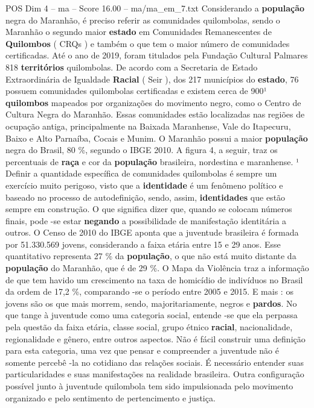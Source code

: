 \begin{textsample}{POS Dim 4 – ma – Score 16.00 – ma/ma\_em\_7.txt}
Considerando a \textbf{população} negra do Maranhão, é preciso referir as comunidades quilombolas, sendo o Maranhão o segundo maior \textbf{estado} em Comunidades Remanescentes de \textbf{Quilombos} ( CRQs ) e também o que tem o maior número de comunidades certificadas.
Até o ano de 2019, foram titulados pela Fundação Cultural Palmares 818 \textbf{territórios} quilombolas.
De acordo com a Secretaria de Estado Extraordinária de Igualdade \textbf{Racial} ( Seir ), dos 217 municípios do \textbf{estado}, 76 possuem comunidades quilombolas certificadas e existem cerca de 900¹ \textbf{quilombos} mapeados por organizações do movimento negro, como o Centro de Cultura Negra do Maranhão.
Essas comunidades estão localizadas nas regiões de ocupação antiga, principalmente na Baixada Maranhense, Vale do Itapecuru, Baixo e Alto Parnaíba, Cocais e Munim.
O Maranhão possui a maior \textbf{população} negra do Brasil, 80 \%, segundo o IBGE 2010.
A figura 4, a seguir, traz os percentuais de \textbf{raça} e cor da \textbf{população} brasileira, nordestina e maranhense. ¹ Definir a quantidade específica de comunidades quilombolas é sempre um exercício muito perigoso, visto que a \textbf{identidade} é um fenômeno político e baseado no processo de autodefinição, sendo, assim, \textbf{identidades} que estão sempre em construção.
O que significa dizer que, quando se colocam números finais, pode -se estar \textbf{negando} a possibilidade de manifestação identitária a outros.
O Censo de 2010 do IBGE aponta que a juventude brasileira é formada por 51.330.569 jovens, considerando a faixa etária entre 15 e 29 anos.
Esse quantitativo representa 27 \% da \textbf{população}, o que não está muito distante da \textbf{população} do Maranhão, que é de 29 \%.
O Mapa da Violência traz a informação de que tem havido um crescimento na taxa de homicídio de indivíduos no Brasil da ordem de 17,2 \%, comparando -se o período entre 2005 e 2015.
E mais : os jovens são os que mais morrem, sendo, majoritariamente, negros e \textbf{pardos}.
No que tange à juventude como uma categoria social, entende -se que ela perpassa pela questão da faixa etária, classe social, grupo étnico \textbf{racial}, nacionalidade, regionalidade e gênero, entre outros aspectos.
Não é fácil construir uma definição para esta categoria, uma vez que pensar e compreender a juventude não é somente percebê -la no cotidiano das relações sociais.
É necessário entender suas particularidades e suas manifestações na realidade brasileira.
Outra configuração possível junto à juventude quilombola tem sido impulsionada pelo movimento organizado e pelo sentimento de pertencimento e justiça.

\end{textsample}
